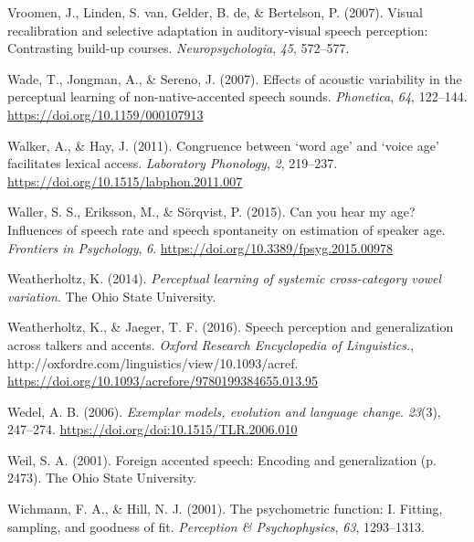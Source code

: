 \documentclass[
  11pt,
  english,
  man,floatsintext]{apa6}
\newlength{\cslhangindent}
\newlength{\cslentryspacingunit} %
\newenvironment{CSLReferences}[2] %
 {%
  \setlength{\parindent}{0pt}
  \ifodd #1
  \let\oldpar\par
  \def\par{\hangindent=\cslhangindent\oldpar}
  \fi
  \setlength{\parskip}{#2\cslentryspacingunit}
 }%
 {}
\begin{document}
\begin{CSLReferences}{1}{0}
\leavevmode{}%
Vroomen, J., Linden, S. van, Gelder, B. de, \& Bertelson, P. (2007). Visual recalibration and selective adaptation in auditory-visual speech perception: Contrasting build-up courses. \emph{Neuropsychologia}, \emph{45}, 572--577.

\leavevmode{}%
Wade, T., Jongman, A., \& Sereno, J. (2007). Effects of acoustic variability in the perceptual learning of non-native-accented speech sounds. \emph{Phonetica}, \emph{64}, 122--144. \url{https://doi.org/10.1159/000107913}

\leavevmode{}%
Walker, A., \& Hay, J. (2011). Congruence between {`word age'} and {`voice age'} facilitates lexical access. \emph{Laboratory Phonology}, \emph{2}, 219--237. \url{https://doi.org/10.1515/labphon.2011.007}

\leavevmode{}%
Waller, S. S., Eriksson, M., \& Sörqvist, P. (2015). Can you hear my age? Influences of speech rate and speech spontaneity on estimation of speaker age. \emph{Frontiers in Psychology}, \emph{6}. \url{https://doi.org/10.3389/fpsyg.2015.00978}

\leavevmode{}%
Weatherholtz, K. (2014). \emph{Perceptual learning of systemic cross-category vowel variation}. The Ohio State University.

\leavevmode{}%
Weatherholtz, K., \& Jaeger, T. F. (2016). Speech perception and generalization across talkers and accents. \emph{Oxford Research Encyclopedia of Linguistics.}, http://oxfordre.com/linguistics/view/10.1093/acref. \url{https://doi.org/10.1093/acrefore/9780199384655.013.95}

\leavevmode{}%
Wedel, A. B. (2006). \emph{Exemplar models, evolution and language change}. \emph{23}(3), 247--274. \url{https://doi.org/doi:10.1515/TLR.2006.010}

\leavevmode{}%
Weil, S. A. (2001). Foreign accented speech: Encoding and generalization (p. 2473). The Ohio State University.

\leavevmode{}%
Wichmann, F. A., \& Hill, N. J. (2001). The psychometric function: I. Fitting, sampling, and goodness of fit. \emph{Perception \& Psychophysics}, \emph{63}, 1293--1313.


\end{CSLReferences}
\end{document}
